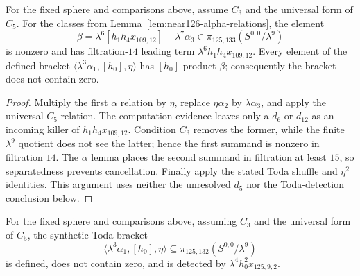 \begin{lemma}
  \label{lem:toda-h0-leading-nonvanishing}
  \notready
  For the fixed sphere and comparisons above, assume $C_3$ and the universal form
  of $C_5$.  For the classes from
  Lemma~\ref{lem:near126-alpha-relations}, the element
  \[
    \beta=\lambda^6[h_1h_4x_{109,12}]+\lambda^7\alpha_3
      \in\pi_{125,133}(S^{0,0}/\lambda^9)
  \]
  is nonzero and has filtration-$14$ leading term
  $\lambda^6h_1h_4x_{109,12}$.  Every element of the defined bracket
  $\langle\lambda^3\alpha_1,[h_0],\eta\rangle$ has $[h_0]$-product
  $\beta$; consequently the bracket does not contain zero.
\end{lemma}

\begin{proof}
  Multiply the first $\alpha$ relation by $\eta$, replace
  $\eta\alpha_2$ by $\lambda\alpha_3$, and apply the universal $C_5$
  relation.  The computation evidence leaves only a $d_6$ or $d_{12}$ as an
  incoming killer of $h_1h_4x_{109,12}$.  Condition $C_3$ removes the former,
  while the finite $\lambda^9$ quotient does not see the latter; hence the
  first summand is nonzero in filtration $14$.  The $\alpha$ lemma places the
  second summand in filtration at least $15$, so separatedness prevents
  cancellation.  Finally apply the stated Toda shuffle and
  $\eta^2$ identities.  This argument uses neither the unresolved $d_5$ nor
  the Toda-detection conclusion below.
\end{proof}

\begin{lemma}
  \label{lem:toda-two-extension}
  \notready
  For the fixed sphere and comparisons above, assuming $C_3$ and the universal
  form of $C_5$, the synthetic Toda bracket
  \[
    \langle\lambda^3\alpha_1,[h_0],\eta\rangle
       \subseteq\pi_{125,132}(S^{0,0}/\lambda^9)
  \]
  is defined, does not contain zero, and is detected by
  $\lambda^4h_0^2x_{125,9,2}$.
\end{lemma}

